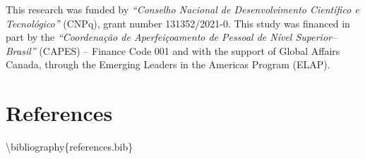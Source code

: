 \documentclass[preprint, 3p,
authoryear]{elsarticle} %
\begin{document}
This research was funded by \emph{``Conselho Nacional de Desenvolvimento
Científico e Tecnológico''} (CNPq), grant number 131352/2021-0. This
study was financed in part by the \emph{``Coordenação de Aperfeiçoamento
de Pessoal de Nível Superior--Brasil''} (CAPES) -- Finance Code 001 and
with the support of Global Affairs Canada, through the Emerging Leaders
in the Americas Program (ELAP).

\hypertarget{references}{%
\section{References}\label{references}}

\textbackslash bibliography\{references.bib\}


\end{document}
